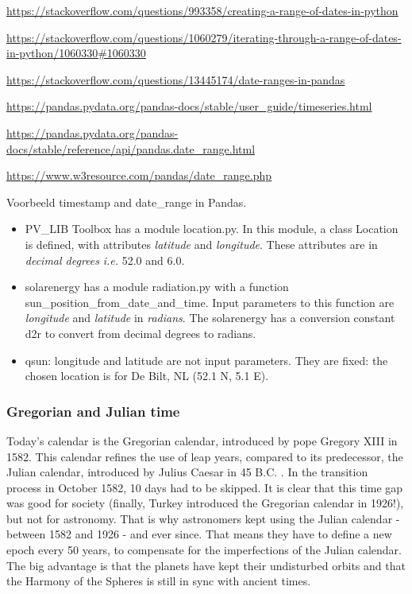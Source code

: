 \url{https://stackoverflow.com/questions/993358/creating-a-range-of-dates-in-python}

\url{https://stackoverflow.com/questions/1060279/iterating-through-a-range-of-dates-in-python/1060330#1060330}

\url{https://stackoverflow.com/questions/13445174/date-ranges-in-pandas}

\url{https://pandas.pydata.org/pandas-docs/stable/user_guide/timeseries.html}

\url{https://pandas.pydata.org/pandas-docs/stable/reference/api/pandas.date_range.html}

\url{https://www.w3resource.com/pandas/date_range.php}


Voorbeeld timestamp and date\_range in Pandas.

\begin{itemize}
	\item \textsf{PV\_LIB Toolbox} has a  module \textsf{location.py}. In this module, a class \textsf{Location} is defined, with attributes  \emph{latitude} and \emph{longitude}. These attributes are in \emph{decimal degrees} \textit{i.e.} 52.0 and 6.0. 
	\item \textsf{solarenergy} has a module \textsf{radiation.py} with  a function \textsf{sun\_position\_from\_date\_and\_time}. Input parameters to this function are \emph{longitude} and \emph{latitude} in \emph{radians}. The \textsf{solarenergy} has a conversion constant \textsf{d2r} to convert from decimal degrees to radians. 
	\item \textsf{qsun}: longitude and latitude are not input parameters. They are fixed: the chosen location is for De Bilt, NL (52.1 N, 5.1 E).
\end{itemize}

\subsubsection{Gregorian and Julian time}

Today's calendar is the Gregorian calendar, introduced by pope Gregory XIII in 1582. This calendar refines the use of leap years, compared to its predecessor, the Julian calendar, introduced by Julius Caesar in 45 B.C. \cite{timeanddate}. In the transition process in October 1582, 10 days had to be skipped. It is clear that this time gap was good for society (finally, Turkey introduced the Gregorian calendar in 1926!), but not for astronomy. That is why astronomers kept using the Julian calendar - between 1582 and 1926 - and ever since. That means they have to define a new epoch every 50 years, to compensate for the imperfections of the Julian calendar. The big advantage is that the planets have kept their undisturbed orbits and that the Harmony of the Spheres is still in sync with ancient times.

